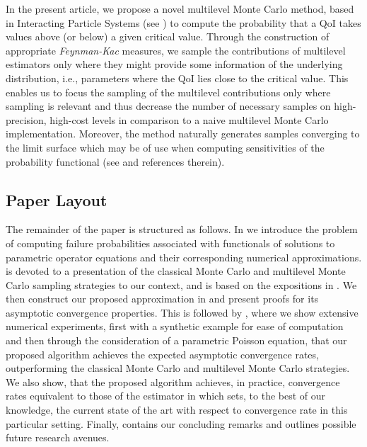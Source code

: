 \documentclass{article}
\theoremstyle{definition}
\begin{document}
In the present article, we propose a novel multilevel Monte Carlo method, based in Interacting Particle
Systems (see \cite{cerouNonasymptoticTheoremUnnormalized2011,DelMoralFeynmanKac2004,delmoralGenealogicalParticleAnalysis2005,moralMultilevelSequentialMonte2017})
to compute the probability that a QoI takes values above (or below) a given critical value.
Through the construction of appropriate \emph{Feynman-Kac} measures, we sample the contributions of multilevel estimators only
where they might provide some information of the underlying distribution, i.e., parameters where the QoI lies close to the critical
value. This enables us to focus the sampling of the multilevel contributions only where sampling is relevant and thus decrease the number
of necessary samples on high-precision, high-cost levels in comparison to a naive multilevel Monte Carlo implementation.
Moreover, the method naturally generates samples converging to the limit surface which may be of use when computing sensitivities
  of the probability functional (see \cite{papaioannouReliabilitySensitivityEstimation2018} and references therein).

\subsection{Paper Layout}
\label{ssec:struc}
The remainder of the paper is structured as follows. In  we introduce the problem of computing failure probabilities
associated with functionals of solutions to parametric operator equations and their corresponding
numerical approximations.  is devoted to a presentation of the classical Monte Carlo and
multilevel Monte Carlo sampling strategies to our context, and is based on the expositions in
\cite{barthMultilevelMonteCarlo2011,cliffeMultilevelMonteCarlo2011,
  elfversonMultilevelMonteCarlo2016,haji-aliAdaptiveMultilevelMonte2022}.
We then construct our proposed approximation in  and present proofs for its
asymptotic convergence properties. This is followed by , where we show
extensive numerical experiments, first with a synthetic example for ease of computation and
then through the consideration of a parametric Poisson equation, that our proposed algorithm
achieves the expected asymptotic convergence rates, outperforming the classical Monte Carlo and multilevel Monte Carlo strategies. We also show,
that the proposed algorithm achieves, in practice, convergence rates equivalent to those of the estimator in \cite{haji-aliAdaptiveMultilevelMonte2022}
which sets, to the best of our knowledge, the current state of the art with respect to convergence rate in this particular setting. Finally,
 contains our concluding remarks and outlines possible future research avenues.
\end{document}
